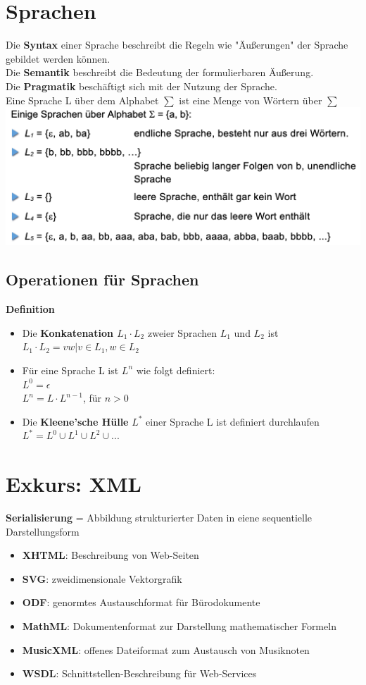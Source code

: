 \documentclass{scrreprt}
\begin{document}
\section{Sprachen}
Die \textbf{Syntax} einer Sprache beschreibt die Regeln wie "Äußerungen" der Sprache gebildet werden können.
\\Die \textbf{Semantik} beschreibt die Bedeutung der formulierbaren Äußerung.
\\Die \textbf{Pragmatik} beschäftigt sich mit der Nutzung der Sprache.
\\Eine Sprache L über dem Alphabet $\sum$ ist eine Menge von Wörtern über $\sum$ \\
\includegraphics[width=1\textwidth]{"graphics/sprache"}
\subsection{Operationen für Sprachen}
\textbf{Definition}
\begin{itemize}
    \item Die \textbf{Konkatenation $L_{1} \cdot L_{2}$} zweier Sprachen $L_{1}$ und $L_{2}$ ist
    \\$L_{1} \cdot L_{2} = {vw | v \in L_{1}, w \in L_{2}}$
    \item Für eine Sprache L ist $L^{n}$ wie folgt definiert:
    \\$L^{0} = {\epsilon}$
    \\$L^{n} = L \cdot L^{n-1}$, für $n>0$
    \item Die \textbf{Kleene'sche Hülle} $L^{*}$ einer Sprache L ist definiert durchlaufen
    \\$L^{*} = L^{0} \cup L^{1} \cup L^{2} \cup ...$
\end{itemize}
\section{Exkurs: XML}
\textbf{Serialisierung} = Abbildung strukturierter Daten in eiene sequentielle Darstellungsform
\begin{itemize}
    \item \textbf{XHTML}: Beschreibung von Web-Seiten
    \item \textbf{SVG}: zweidimensionale Vektorgrafik
    \item \textbf{ODF}: genormtes Austauschformat für Bürodokumente
    \item \textbf{MathML}: Dokumentenformat zur Darstellung mathematischer Formeln
    \item \textbf{MusicXML}: offenes Dateiformat zum Austausch von Musiknoten
    \item \textbf{WSDL}: Schnittstellen-Beschreibung für Web-Services
\end{itemize}
\end{document}
